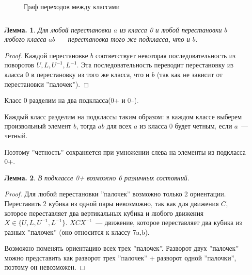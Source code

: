 \documentclass[utf8,russian]{beamer}
\newtheorem{ru_theo}{Лемма.}
\renewenvironment{theorem}{\begin{ru_theo}}{\end{ru_theo}}
\begin{document}
\begin{frame}
\begin{columns}[c]
\begin{figure}[c]
{
	}
	\caption{Граф переходов между классами\label{states_graph}}
\end{figure}
\end{columns}
\end{frame}

\begin{frame}
	\begin{theorem}
		Для любой перестановки $a$ из класса 0 и любой перестановки $b$ любого класса $ab$~--- перестановка того же подкласса, что и $b$.
	\end{theorem}
	\begin{proof}
		Каждой перестановке $b$ соответствует некоторая последовательность из поворотов $U,L,U^{-1},L^{-1}$. Эта последовательность переводит перестановку из класса 0 в перестановку из того же класса, что и $b$ (так как не зависит от перестановки ''палочек''). 	
	\end{proof}
	Класс 0 разделим на два подкласса(0+ и 0--).
	
	Каждый класс разделим на подклассы таким образом:
	в каждом классе выберем произвольный элемент $b$, тогда $ab$ для всех $a$ из класса 0 будет четным, если $a$~--- четный.
	
	Поэтому ''четность'' сохраняется при умножении слева на элементы из подкласса 0+.
\end{frame}

\begin{frame}
\begin{theorem}
В подклассе 0+ возможно 6 различных состояний.
\end{theorem}
\begin{proof}
Для любой перестановки ''палочек'' возможно только 2 ориентации.
Переставить 2 кубика из одной пары невозможно, так как для движения $C$, которое переставляет два вертикальных кубика и любого движения $X\in\{U,L,U^{-1},L^{-1}\}$. $XCX^{-1}$~--- движение, которое переставляет два кубика из разных ''палочек'' (оно относится к классу 7a,b).

Возможно поменять ориентацию всех трех ''палочек''. Разворот двух ''палочек'' можно представить как разворот трех ''палочек'' + разворот одной ''палочки'', поэтому он невозможен.
\end{proof}
\end{frame}
\end{document}
